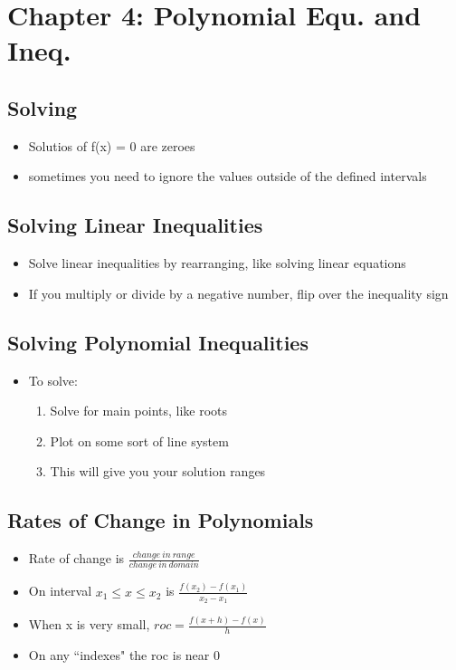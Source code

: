 \documentclass{article}
\begin{document}
    \section{Chapter 4: Polynomial Equ. and Ineq.}

    \subsection{Solving}
    \begin{itemize}
        \item Solutios of f(x) = 0 are zeroes
        \item sometimes you need to ignore the values outside of the defined intervals
    \end{itemize}

    \subsection{Solving Linear Inequalities}
    \begin{itemize}
        \item Solve linear inequalities by rearranging, like solving linear equations
        \item If you multiply or divide by a negative number, flip over the inequality sign 
    \end{itemize}

    \subsection{Solving Polynomial Inequalities}
    \begin{itemize}
        \item To solve:
        \begin{enumerate}
            \item Solve for main points, like roots
            \item Plot on some sort of line system
            \item This will give you your solution ranges
        \end{enumerate}
    \end{itemize}

    \subsection{Rates of Change in Polynomials}
    \begin{itemize}
        \item Rate of change is $\frac{change \:in \: range}{change \: in \: domain}$
        \item On interval $x_1 \leq x \leq x_2 $ is $\frac{f(x_2) - f(x_1)}{x_2 - x_1}$
        \item When x is very small, $roc = \frac{f(x + h) - f(x)}{h}$
        \item On any ``indexes" the roc is near 0
    \end{itemize}
\end{document}
